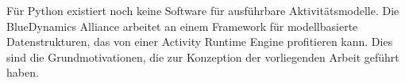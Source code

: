 Für Python existiert noch keine Software für ausführbare Aktivitätsmodelle. Die BlueDynamics Alliance arbeitet an einem Framework für modellbasierte Datenstrukturen, das von einer Activity Runtime Engine profitieren kann. Dies sind die Grundmotivationen, die zur Konzeption der vorliegenden Arbeit geführt haben.
